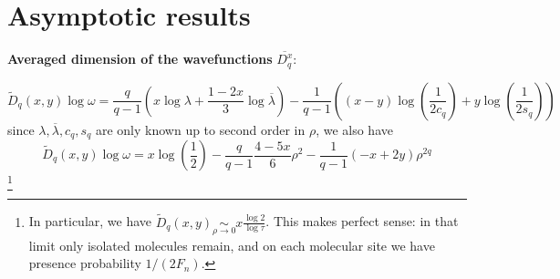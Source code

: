 \documentclass[11pt]{article}
\newcommand{\simlim}[2]{\ensuremath{ \underset{#1 \rightarrow #2}{\sim} }}
\newcommand{\om}{\ensuremath{\omega}}
\newcommand{\lb}{\ensuremath{\lambda}}
\newcommand{\lbbar}{\ensuremath{\overline{\lambda}}}
\begin{document}
\section{Asymptotic results}

\textbf{Averaged dimension of the wavefunctions} $\boxed{\overline{D^x_q}}$:

\begin{equation}
	\tilde{D}_q(x,y) \log \om = \frac{q}{q-1} \left( x \log \lb + \frac{1-2x}{3} \log \lbbar \right) - \frac{1}{q-1}\left( (x-y) \log\left(\frac{1}{2 c_q}\right) + y \log\left(\frac{1}{2 s_q}\right) \right)
\end{equation} 
since $\lb, \lbbar, c_q, s_q$ are only known up to second order in $\rho$, we also have
\begin{equation}
	\tilde{D}_q(x,y) \log \om = x \log\left( \frac{1}{2} \right) -\frac{q}{q-1} \frac{4-5x}{6} \rho^2 -\frac{1}{q-1}(-x+2y) \rho^{2q}
\end{equation}
\footnote{In particular, we have $\tilde{D}_q(x,y) \simlim{\rho}{0} x\frac{\log 2}{\log \tau}$. This makes perfect sense: in that limit only isolated molecules remain, and on each molecular site we have presence probability $1/(2 F_n)$.}


{}

\end{document}
